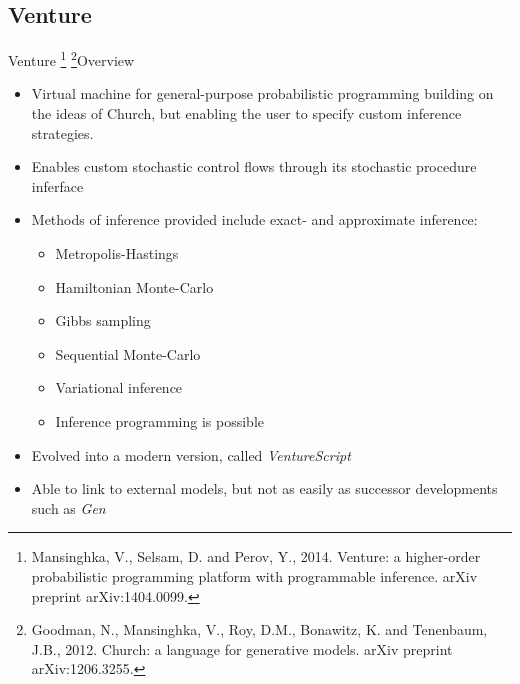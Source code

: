 \documentclass[AERbeamer%
              ,optEnglish%
              ,optBiber%
              ,optBibstyleAlphabetic%
              ,optBeamerClassicFormat%
              ]{AERlatex}%
\begin{document}
\subsection{Venture}
\begin{frame}[c]{Venture \footnote{Mansinghka, V., Selsam, D. and Perov, Y., 2014.
                                   Venture: a higher-order probabilistic programming platform
                                   with programmable inference. arXiv preprint arXiv:1404.0099.}
                         \footnote{Goodman, N., Mansinghka, V., Roy, D.M., Bonawitz, K. and Tenenbaum, J.B., 2012.
                                   Church: a language for generative models. arXiv preprint arXiv:1206.3255.}}{Overview}
    \centering
    \begin{itemize}
        \item Virtual machine for general-purpose probabilistic programming building on the ideas of Church,
              but enabling the user to specify custom inference strategies.
        \item Enables custom stochastic control flows through its stochastic procedure inferface
        \item Methods of inference provided include exact- and approximate inference:
        \begin{itemize}
            \item Metropolis-Hastings
            \item Hamiltonian Monte-Carlo
            \item Gibbs sampling
            \item Sequential Monte-Carlo
            \item Variational inference
            \item Inference programming is possible
        \end{itemize}
        \item Evolved into a modern version, called \textit{VentureScript}
        \item Able to link to external models, but not as easily as successor developments such as \textit{Gen}
    \end{itemize}
\end{frame}
\end{document}
